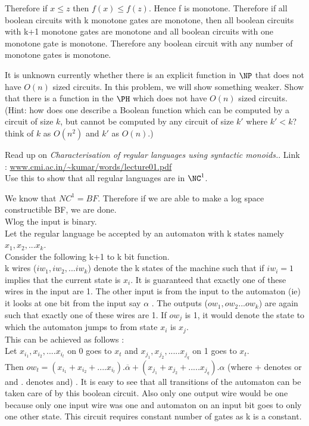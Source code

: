 \documentclass[12pt]{exam}
\begin{document}
\begin{questions}
\begin{solution}
\begin{parts}
Therefore if $x \le z$ then $f(x) \le f(z)$. Hence f is monotone.
Therefore if all boolean circuits with
k monotone gates are monotone, then all boolean circuits with
k+1 monotone gates are monotone and all boolean circuits with
one monotone gate is monotone. Therefore any boolean circuit
with any number of monotone gates is monotone.
\end{parts}
\end{solution}
\question[10]
It is unknown currently whether there is an explicit function in $\NP$ that does not have $O(n)$ sized circuits. In this problem, we will show something weaker. Show that there is a function in the $\PH$ which does not have
$O(n)$ sized circuits. (Hint: how does one describe a Boolean function which can be computed by a circuit of size $k$, but cannot be computed by any circuit of size $k'$ where $k' < k$? think of $k$ as $O(n^2)$ and $k'$ as $O(n)$.)

\question[10]
Read up on {\em Characterisation of regular languages using syntactic monoids.}. Link : \href{http://www.cmi.ac.in/~kumar/words/lecture01.pdf}{www.cmi.ac.in/\~{ }kumar/words/lecture01.pdf}\\
Use this to show that all regular languages are in $\NC^1$.
\begin{solution}
We know that ${NC}^1 = BF$. Therefore if we are able to
make a log space constructible BF, we are done.\\
Wlog the input is binary.\\

Let the regular language be accepted by an automaton with k states
namely $x_1, x_2, ... x_k$.\\
Consider the following k+1 to k bit function.\\
k wires ($iw_1, {iw}_2, ... {iw}_k$) denote the k states of the machine such
that if ${iw}_i = 1$ implies that the current state is $x_i$. It is guaranteed
that exactly one of these wires in the input are 1. The other input is from the
input to the automaton (ie) it looks at one bit from the input say $\alpha$
. The outputs (${ow}_1, {ow}_2 ... {ow}_k$) are again
such that exactly one of these wires are 1. If ${ow}_j$ is 1, it would denote the state
to which the automaton jumps to from state $x_i$ is $x_j$.\\
This can be achieved as follows :\\
Let $x_{i_1}, x_{i_2}, .... x_{i_l}$ on 0 goes to $x_t$ and
$x_{j_1}, x_{j_2}, ..... x_{j_q}$ on 1 goes to $x_t$.\\
Then ${ow}_t = (x_{i_1} + x_{i_2} + .... x_{i_l}).\overline{\alpha} + (x_{j_1} + x_{j_2}
+ ..... x_{j_q}).\alpha$ (where + denotes or and . denotes and) . It is
easy to see that all transitions of the automaton can be taken care of by
this boolean circuit. Also only one output wire would be one because
only one input wire was one and automaton on an input bit goes to only
one other state. This circuit requires constant number of gates as k is
a constant.\\


\end{solution}
\end{questions}
\end{document}
